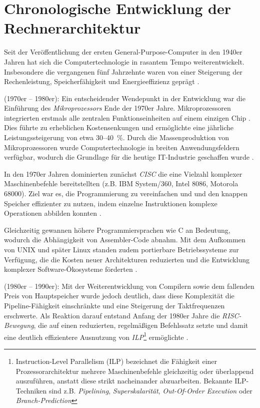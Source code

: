 \section{Chronologische Entwicklung der Rechnerarchitektur}\label{chap:3-3-development_ca}

Seit der Veröffentlichung der ersten General-Purpose-Computer in den 1940er Jahren hat sich die Computertechnologie in rasantem Tempo weiterentwickelt. Insbesondere die vergangenen fünf Jahrzehnte waren von einer Steigerung der Rechenleistung, Speicherfähigkeit und Energieeffizienz geprägt \parencite[S.~2]{hennessy_computer_2011}.

(1970er -- 1980er): Ein entscheidender Wendepunkt in der Entwicklung war die Einführung des \textit{Mikroprozessors} Ende der 1970er Jahre. Mikroprozessoren integrierten erstmals alle zentralen Funktionseinheiten auf einem einzigen Chip \parencite[S.~9]{dumas_ii_computer_2006}. Dies führte zu erheblichen Kostensenkungen und ermöglichte eine jährliche Leistungssteigerung von etwa 30–40~\%. Durch die Massenproduktion von Mikroprozessoren wurde Computertechnologie in breiten Anwendungsfeldern verfügbar, wodurch die Grundlage für die heutige IT-Industrie geschaffen wurde \parencites[S.~2]{hennessy_computer_2011}[S.~11]{dumas_ii_computer_2006}.

In den 1970er Jahren dominierten zunächst \textit{\ac{CISC}} die eine Vielzahl komplexer Maschinenbefehle bereitstellten (z.B. IBM System/360, Intel 8086, Motorola 68000). Ziel war es, die Programmierung zu vereinfachen und und den knappen Speicher effizienter zu nutzen, indem einzelne Instruktionen komplexe Operationen abbilden konnten \parencite[S.~12]{dumas_ii_computer_2006}.

Gleichzeitig gewannen höhere Programmiersprachen wie C an Bedeutung, wodurch die Abhängigkeit von Assembler-Code abnahm. Mit dem Aufkommen von UNIX und später Linux standen zudem portierbare Betriebssysteme zur Verfügung, die die Kosten neuer Architekturen reduzierten und die Entwicklung komplexer Software-Ökosysteme förderten \parencites[S.~2]{hennessy_computer_2011}[S.~12]{dumas_ii_computer_2006}.

(1980er -- 1990er): Mit der Weiterentwicklung von Compilern sowie dem fallenden Preis von Hauptspeicher wurde jedoch deutlich, dass diese Komplexität die Pipeline-Fähigkeit einschränkte und eine Steigerung der Taktfrequenzen erschwerte. Als Reaktion darauf entstand Anfang der 1980er Jahre die \textit{\ac{RISC}-Bewegung}, die auf einen reduzierten, regelmäßigen Befehlssatz setzte und damit eine deutlich effizientere Ausnutzung von \textit{\ac{ILP}}\footnote{Instruction-Level Parallelism (ILP) bezeichnet die Fähigkeit einer Prozessorarchitektur mehrere Maschinenbefehle gleichzeitig oder überlappend auszuführen, anstatt diese strikt nacheinander abzuarbeiten. Bekannte ILP-Techniken sind z.B. \textit{Pipelining}, \textit{Superskalarität}, \textit{Out-Of-Order Execution} oder \textit{Branch-Prediction}} ermöglichte \parencite[S.~2]{hennessy_computer_2011}.  

